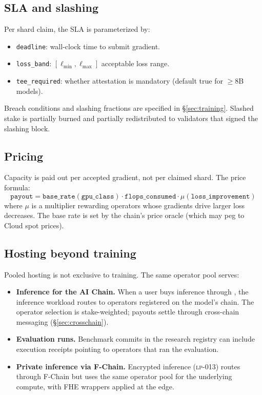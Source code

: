 \subsection{SLA and slashing}

Per shard claim, the SLA is parameterized by:
\begin{itemize}[nosep]
\item \texttt{deadline}: wall-clock time to submit gradient.
\item \texttt{loss\_band}: $[\ell_{\min}, \ell_{\max}]$ acceptable loss range.
\item \texttt{tee\_required}: whether \TEE{} attestation is mandatory (default true for $\ge$8B models).
\end{itemize}

Breach conditions and slashing fractions are specified in \S\ref{sec:training}. Slashed stake is partially burned and partially redistributed to validators that signed the slashing block.

\subsection{Pricing}

Capacity is paid out per accepted gradient, not per claimed shard. The price formula:
\begin{equation}
\texttt{payout} = \texttt{base\_rate}(\texttt{gpu\_class}) \cdot \texttt{flops\_consumed} \cdot \mu(\texttt{loss\_improvement})
\end{equation}
where $\mu$ is a multiplier rewarding operators whose gradients drive larger loss decreases. The base rate is set by the chain's price oracle (which may peg to \Lux{} Cloud spot prices).

\subsection{Hosting beyond training}

Pooled \GPU{} hosting is not exclusive to training. The same operator pool serves:
\begin{itemize}[nosep]
\item \textbf{Inference for the \Hanzo{} AI Chain.} When a user buys inference through \Hanzo{}, the inference workload routes to operators registered on the model's chain. The operator selection is stake-weighted; payouts settle through cross-chain messaging (\S\ref{sec:crosschain}).
\item \textbf{Evaluation runs.} Benchmark commits in the research registry can include execution receipts pointing to operators that ran the evaluation.
\item \textbf{Private inference via F-Chain.} Encrypted inference (\textsc{lp-013}) routes through F-Chain but uses the same operator pool for the underlying compute, with FHE wrappers applied at the edge.
\end{itemize}

